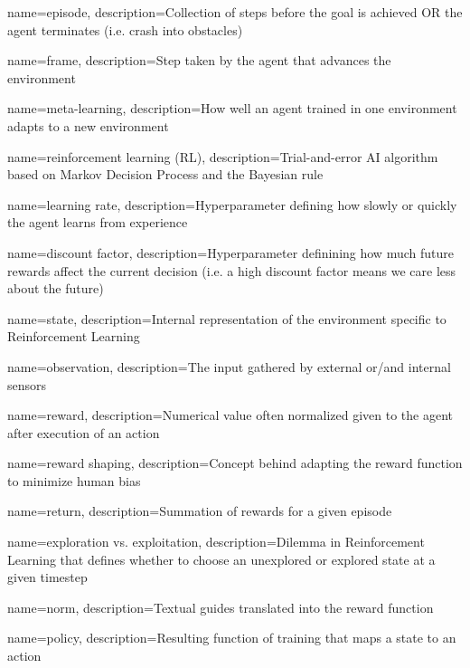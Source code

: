 {
    name=episode,
    description={Collection of steps before the goal is achieved OR the agent 
            terminates (i.e. crash into obstacles)}
}

{
    name=frame,
    description={Step taken by the agent that advances the environment}
}

{
    name=meta-learning,
    description={How well an agent trained in one environment 
        adapts to a new environment}
}

{
    name=reinforcement learning (RL),
    description={Trial-and-error AI algorithm based on Markov Decision Process 
            and the Bayesian rule}
}

{
    name=learning rate,
    description={Hyperparameter defining how slowly or quickly the agent 
            learns from experience}
}

{
    name=discount factor,
    description={Hyperparameter definining how much future rewards 
    affect the current decision (i.e. a high discount factor means we care less 
    about the future)}
}

{
    name=state,
    description={Internal representation of the environment specific to Reinforcement Learning}
}

{
    name=observation,
    description={The input gathered by external or/and internal sensors}
}

{
    name=reward,
    description={Numerical value often normalized given to the agent after execution of an action}
}

{
    name=reward shaping,
    description={Concept behind adapting the reward function to minimize human bias}
}

{
    name=return,
    description={Summation of rewards for a given episode}
}

{
    name=exploration vs. exploitation,
    description={Dilemma in Reinforcement Learning that defines whether to choose 
    an unexplored or explored state at a given timestep}
}


{
    name=norm,
    description={Textual guides translated into the reward function}
}

{
    name=policy,
    description={Resulting function of training that maps a state to an action}
}


